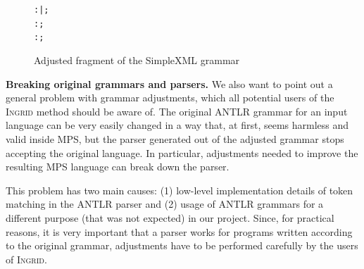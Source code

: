\begin{figure}[ht]
\begin{alltt}
\small
   :     |     ;
   : \antlrregex{~["]*} ;
   : \antlrregex{~[']*} ;
\end{alltt}
\caption{Adjusted fragment of the SimpleXML grammar}
\label{fig:XMLADJUST}
\end{figure}

\noindent\textbf{Breaking original grammars and parsers.}
We also want to point out a general problem with grammar adjustments, which all potential users of the \textsc{Ingrid} method should be aware of.
The original ANTLR grammar for an input language can be very easily changed in a way that, at first, seems harmless and valid inside MPS, but the parser generated out of the adjusted grammar stops accepting the original language.
In particular, adjustments needed to improve the resulting MPS language can break down the parser.

This problem has two main causes: (1) low-level implementation details of token matching in the ANTLR parser and (2) usage of ANTLR grammars for a different purpose (that was not expected) in our project.
Since, for practical reasons, it is very important that a parser works for programs written according to the original grammar, adjustments have to be performed carefully by the users of \textsc{Ingrid}.

